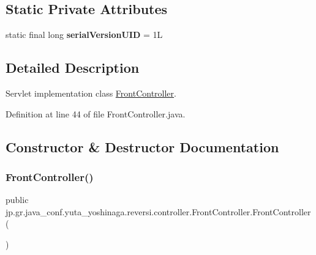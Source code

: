 \subsection*{Static Private Attributes}
\begin{DoxyCompactItemize}
\item 
\mbox{\label{classjp_1_1gr_1_1java__conf_1_1yuta__yoshinaga_1_1reversi_1_1controller_1_1_front_controller_a42e40239dd4f246bd1524cdb08ca41af}} 
static final long {\bfseries serial\+Version\+U\+ID} = 1L
\end{DoxyCompactItemize}


\subsection{Detailed Description}
Servlet implementation class \hyperlink{classjp_1_1gr_1_1java__conf_1_1yuta__yoshinaga_1_1reversi_1_1controller_1_1_front_controller}{Front\+Controller}. 

Definition at line 44 of file Front\+Controller.\+java.



\subsection{Constructor \& Destructor Documentation}
\mbox{\label{classjp_1_1gr_1_1java__conf_1_1yuta__yoshinaga_1_1reversi_1_1controller_1_1_front_controller_a918d736b7b4d8672076c15f8ca05075c}} 
\subsubsection{\texorpdfstring{Front\+Controller()}{FrontController()}}
{\footnotesize\ttfamily public jp.\+gr.\+java\+\_\+conf.\+yuta\+\_\+yoshinaga.\+reversi.\+controller.\+Front\+Controller.\+Front\+Controller (\begin{DoxyParamCaption}{ }\end{DoxyParamCaption})}



